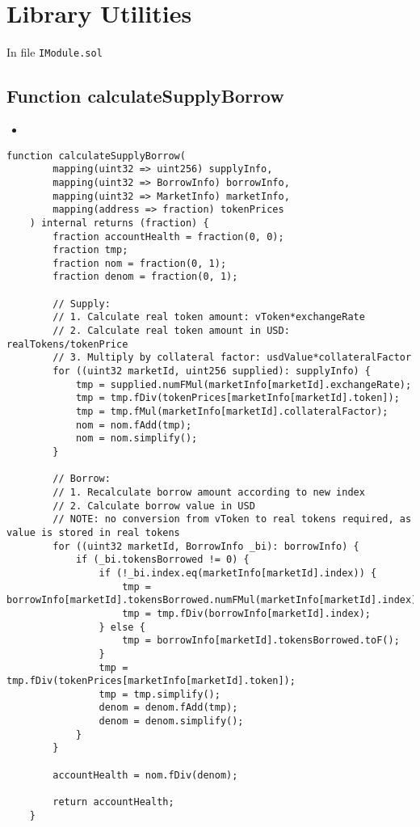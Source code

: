 
\section{Library Utilities}

In file {\tt IModule.sol}

\subsection{Function calculateSupplyBorrow}

\noindent\begin{itemize}
\item {}
\end{itemize}

\begin{lstlisting}[firstnumber=90]
    function calculateSupplyBorrow(
        mapping(uint32 => uint256) supplyInfo,
        mapping(uint32 => BorrowInfo) borrowInfo,
        mapping(uint32 => MarketInfo) marketInfo,
        mapping(address => fraction) tokenPrices
    ) internal returns (fraction) {
        fraction accountHealth = fraction(0, 0);
        fraction tmp;
        fraction nom = fraction(0, 1);
        fraction denom = fraction(0, 1);

        // Supply:
        // 1. Calculate real token amount: vToken*exchangeRate
        // 2. Calculate real token amount in USD: realTokens/tokenPrice
        // 3. Multiply by collateral factor: usdValue*collateralFactor
        for ((uint32 marketId, uint256 supplied): supplyInfo) {
            tmp = supplied.numFMul(marketInfo[marketId].exchangeRate);
            tmp = tmp.fDiv(tokenPrices[marketInfo[marketId].token]);
            tmp = tmp.fMul(marketInfo[marketId].collateralFactor);
            nom = nom.fAdd(tmp);
            nom = nom.simplify();
        }

        // Borrow:
        // 1. Recalculate borrow amount according to new index
        // 2. Calculate borrow value in USD
        // NOTE: no conversion from vToken to real tokens required, as value is stored in real tokens
        for ((uint32 marketId, BorrowInfo _bi): borrowInfo) {
            if (_bi.tokensBorrowed != 0) {
                if (!_bi.index.eq(marketInfo[marketId].index)) {
                    tmp = borrowInfo[marketId].tokensBorrowed.numFMul(marketInfo[marketId].index);
                    tmp = tmp.fDiv(borrowInfo[marketId].index);
                } else {
                    tmp = borrowInfo[marketId].tokensBorrowed.toF();
                }
                tmp = tmp.fDiv(tokenPrices[marketInfo[marketId].token]);
                tmp = tmp.simplify();
                denom = denom.fAdd(tmp);
                denom = denom.simplify();
            }
        }

        accountHealth = nom.fDiv(denom);

        return accountHealth;
    }
\end{lstlisting}
